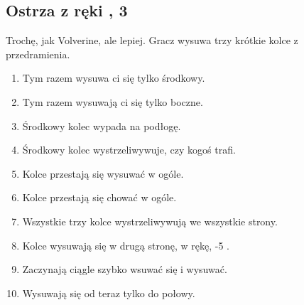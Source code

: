 \subsection{Ostrza z ręki \abh{}, 3 \abnkp{}}
Trochę, jak Volverine, ale lepiej.
Gracz wysuwa trzy krótkie kolce z przedramienia.
\begin{enumerate}
	\item Tym razem wysuwa ci się tylko środkowy.
	\item Tym razem wysuwają ci się tylko boczne.
	\item Środkowy kolec wypada na podłogę.
	\item Środkowy kolec wystrzeliwywuje, \dii{} czy kogoś trafi.
	\item Kolce przestają się wysuwać w ogóle.
	\item Kolce przestają się chować w ogóle.
	\item Wszystkie trzy kolce wystrzeliwywują we wszystkie strony.
	\item Kolce wysuwają się w drugą stronę, w rękę, -5 \abzyc{}.
	\item Zaczynają ciągle szybko wsuwać się i wysuwać.
	\item Wysuwają się od teraz tylko do połowy.
\end{enumerate}








